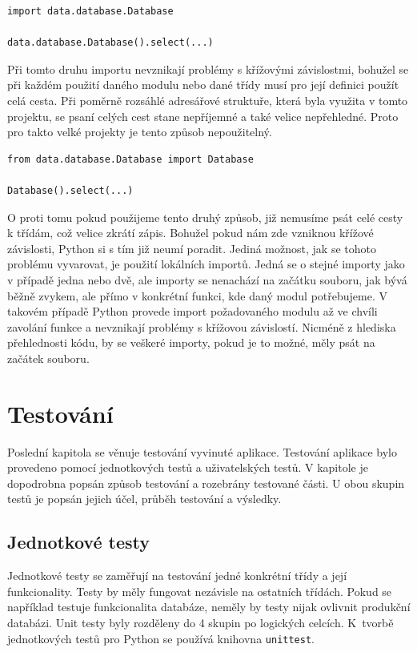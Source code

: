 \documentclass[thesis=B,czech]{resources/FITthesis}[2012/06/26]
\begin{document}
\begin{listing}[htbp]
\begin{verbatim}
import data.database.Database

data.database.Database().select(...)
\end{verbatim}
\end{listing}

Při tomto druhu importu nevznikají problémy s křížovými závislostmi, bohužel se při každém použití daného modulu nebo dané třídy musí pro její definici použít celá cesta. Při poměrně rozsáhlé adresářové struktuře, která byla využita v tomto projektu, se psaní celých cest stane nepříjemné a také velice nepřehledné. Proto pro takto velké projekty je tento způsob nepoužitelný.

\begin{listing}[htbp]
\begin{verbatim}
from data.database.Database import Database

Database().select(...)
\end{verbatim}
\end{listing}
O proti tomu pokud použijeme tento druhý způsob, již nemusíme psát celé cesty k třídám, což velice zkrátí zápis. Bohužel pokud nám zde vzniknou křížové závislosti, Python si s tím již neumí poradit. Jediná možnost, jak se tohoto problému vyvarovat, je použití lokálních importů. Jedná se o stejné importy jako v případě jedna nebo dvě, ale importy se nenachází na začátku souboru, jak bývá běžně zvykem, ale přímo v konkrétní funkci, kde daný modul potřebujeme. V takovém případě Python provede import požadovaného modulu až ve chvíli zavolání funkce a nevznikají problémy s křížovou závislostí. Nicméně z hlediska přehlednosti kódu, by se veškeré importy, pokud je to možné, měly psát na začátek souboru. 



\chapter{Testování}
Poslední kapitola se věnuje testování vyvinuté aplikace. Testování aplikace bylo provedeno pomocí jednotkových testů a uživatelských testů. V kapitole je dopodrobna popsán způsob testování a rozebrány testované části. U obou skupin testů je popsán jejich účel, průběh testování a výsledky.
	\section{Jednotkové testy}
Jednotkové testy se zaměřují na testování jedné konkrétní třídy a její funkcionality. Testy by měly fungovat nezávisle na ostatních třídách. Pokud se například testuje funkcionalita databáze, neměly by testy nijak ovlivnit produkční databázi. Unit testy byly rozděleny do 4 skupin po logických celcích. K~tvorbě jednotkových testů pro Python se používá knihovna \texttt{unittest}.
\end{document}
